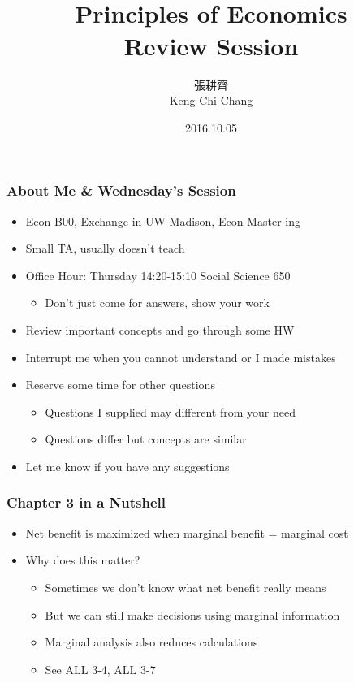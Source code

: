 \documentclass[12pt, xcolor=dvipsnames]{beamer}
\title{\bf{\Huge {}\\[-2mm] Principles of Economics \\[2mm] Review Session}}
\author{{\Large 張耕齊\\[2mm] Keng-Chi Chang}}
\institute{{}\\[-7mm]\footnotesize\tt{<r03323070@ntu.edu.tw>}\\[2mm]}
\date{\large 2016.10.05}
\begin{document}
\fontsize{12}{14pt}\selectfont


\begin{frame}
\titlepage
\end{frame}


\begin{frame}
\frametitle{\bf About Me \& Wednesday's Session}
\begin{itemize}
\item Econ B00, Exchange in UW-Madison, Econ Master-ing
\item Small TA, usually doesn't teach
\item Office Hour: Thursday 14:20-15:10 Social Science 650
\begin{itemize}
\item Don't just come for answers, show your work
\end{itemize}
\item Review important concepts and go through some HW
\item Interrupt me when you cannot understand or I made mistakes
\item Reserve some time for other questions
\begin{itemize}
\item Questions I supplied may different from your need
\item Questions differ but concepts are similar
\end{itemize}
\item Let me know if you have any suggestions
\end{itemize}
\end{frame}


\begin{frame}
\frametitle{\bf Chapter 3 in a Nutshell}
\begin{itemize}
\item Net benefit is maximized when marginal benefit = marginal cost
\item Why does this matter? 
\begin{itemize}
\item Sometimes we don't know what net benefit really means
\item But we can still make decisions using marginal information
\item Marginal analysis also reduces calculations
\item See ALL 3-4, ALL 3-7
\end{itemize}
\end{itemize}
\end{frame}
\end{document}
